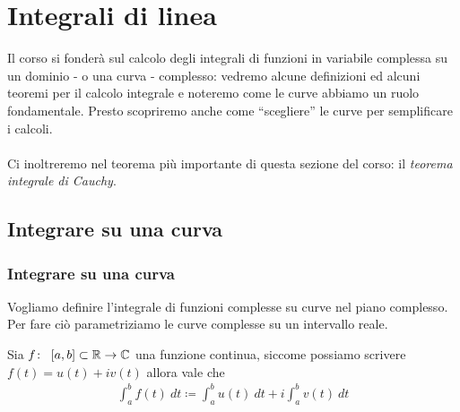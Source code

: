 \chapter{Integrali di linea}
Il corso si fonderà sul calcolo degli integrali di funzioni in variabile complessa su un dominio - o una curva - complesso: vedremo alcune definizioni ed alcuni teoremi per il calcolo integrale e noteremo come le curve abbiamo un ruolo fondamentale. Presto scopriremo anche come \enquote{scegliere} le curve per semplificare i calcoli. \\ \\ Ci inoltreremo nel teorema più importante di questa sezione del corso: il \textit{teorema integrale di Cauchy}.
\newpage
\section{Integrare su una curva}
\subsection{\textcolor{AnComp}{\textbf{Integrare su una curva}}}

Vogliamo definire l'integrale di funzioni complesse su curve nel piano complesso. Per fare ciò parametriziamo le curve complesse su un intervallo reale. 

\begin{definition}
	\label{defn:integrale-funzione-complessa-parametrizzata-su-intervallo-reale}
	Sia $f \colon\ \left[a,b\right]\subset \mathbb{R} \rightarrow \mathbb{C}$ una funzione continua, siccome possiamo scrivere $f(t) = u(t)+ iv(t)$ allora vale che
	\begin{equation*}
	\begin{aligned}
	\int_{a}^{b} f(t)\ dt \coloneqq \int_{a}^{b} u(t)\ dt + i \int_{a}^{b} v(t)\ dt 
	\end{aligned}
	\end{equation*}
\end{definition}

